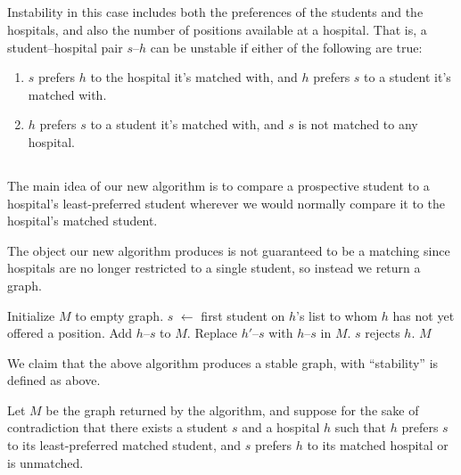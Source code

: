 \documentclass[11pt]{article}
\begin{document}
\subsection{} %
Instability in this case includes both the preferences of the students and the hospitals, and also the number of positions available at a hospital.
That is, a student--hospital pair $s$--$h$ can be unstable if either of the following are true:
\begin{enumerate}
	\item $s$ prefers $h$ to the hospital it's matched with, and $h$ prefers $s$ to a student it's matched with.
	\item $h$ prefers $s$ to a student it's matched with, and $s$ is not matched to any hospital.
\end{enumerate}


\subsection{} %
The main idea of our new algorithm is to compare a prospective student to a hospital's least-preferred student wherever we would normally compare it to the hospital's matched student.

The object our new algorithm produces is not guaranteed to be a matching since hospitals are no longer restricted to a single student, so instead we return a graph.

\begin{algorithm}
\begin{algorithmic}
\State Initialize $M$ to empty graph.
	\State $s$ $\gets$ first student on $h$'s list to whom $h$ has not yet offered a position.
		\State Add $h$--$s$ to $M$.
		\State Replace $h'$--$s$ with $h$--$s$ in $M$.
	\Else
		\State $s$ rejects $h$.
	\EndIf
\EndWhile
\State \Return $M$
\EndFunction
\end{algorithmic}
\end{algorithm}


We claim that the above algorithm produces a stable graph, with ``stability'' is defined as above.

Let $M$ be the graph returned by the algorithm, and suppose for the sake of contradiction that there exists a student $s$ and a hospital $h$ such that $h$ prefers $s$ to its least-preferred matched student, and $s$ prefers $h$ to its matched hospital or is unmatched.
\end{document}
